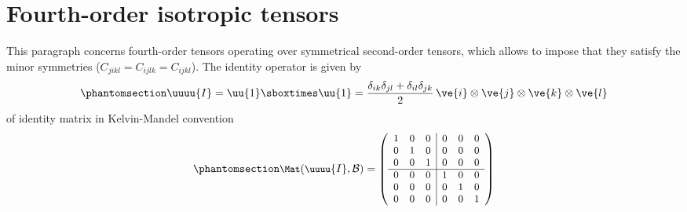 \documentclass[
  letterpaper,
  DIV=11,
  numbers=noendperiod]{scrreprt}
\begin{document}
\section{Fourth-order isotropic tensors}\label{sec-ISO}

This paragraph concerns fourth-order tensors operating over symmetrical
second-order tensors, which allows to impose that they satisfy the minor
symmetries (\(C_{jikl}=C_{ijlk}=C_{ijkl}\)). The identity operator is
given by \begin{equation}\phantomsection\label{eq-tensI}{
\uuuu{I}=\uu{1}\sboxtimes\uu{1}=
\frac{\delta_{ik}\delta_{jl}+\delta_{il}\delta_{jk}}{2}\,\ve{i}\otimes\ve{j}\otimes\ve{k}\otimes\ve{l}
}\end{equation} of identity matrix in Kelvin-Mandel convention
\begin{equation}\phantomsection\label{eq-matI}{
\small
\Mat(\uuuu{I},\mathcal{B})=
   \left(
   \begin{array}{ccc|ccc}
   1 & 0 & 0 & 0 & 0 & 0 \\
   0 & 1 & 0 & 0 & 0 & 0 \\
   0 & 0 & 1 & 0 & 0 & 0 \\
   \hline
   0 & 0 & 0 & 1 & 0 & 0 \\
   0 & 0 & 0 & 0 & 1 & 0 \\
   0 & 0 & 0 & 0 & 0 & 1 \\
   \end{array}
   \right)
}\end{equation}
\end{document}
